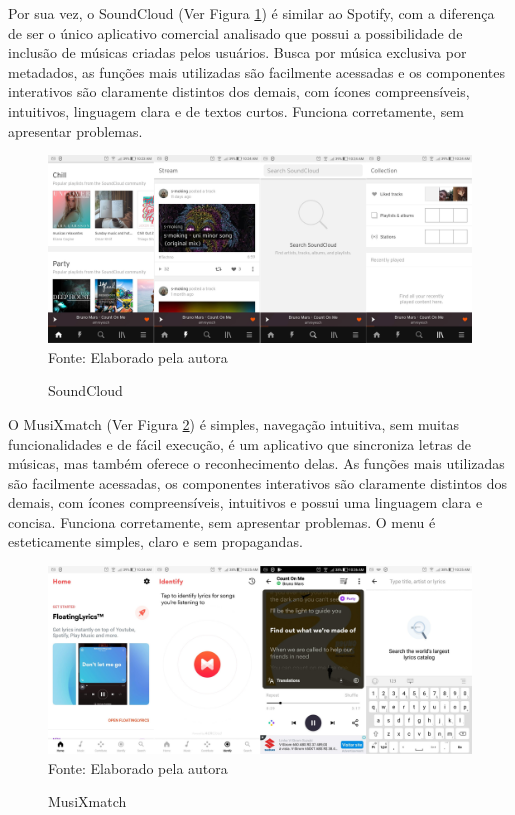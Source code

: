 Por sua vez, o SoundCloud (Ver Figura \ref{fig:soundcloud}) é similar ao Spotify, com a diferença de ser o único aplicativo comercial analisado que possui a possibilidade de inclusão de músicas criadas pelos usuários. Busca por música exclusiva por metadados, as funções mais utilizadas são facilmente acessadas e os componentes interativos são claramente distintos dos demais, com ícones compreensíveis, intuitivos, linguagem clara e de textos curtos. Funciona corretamente, sem apresentar problemas.

\begin{figure}[!htb]
   \centering
   \caption{SoundCloud}\label{fig:soundcloud} 
   \includegraphics[scale=0.12]{figuras/soundcloud.jpg}
   \\Fonte: Elaborado pela autora
\end{figure}

O MusiXmatch (Ver Figura \ref{fig:musixmatch}) é simples, navegação intuitiva, sem muitas funcionalidades e de fácil execução, é um aplicativo que sincroniza letras de músicas, mas também oferece o reconhecimento delas. As funções mais utilizadas são facilmente acessadas, os componentes interativos são claramente distintos dos demais, com ícones compreensíveis, intuitivos e possui uma linguagem clara e concisa. Funciona corretamente, sem apresentar problemas. O menu é esteticamente simples, claro e sem propagandas.

\begin{figure}[!htb]
   \centering
   \caption{MusiXmatch}\label{fig:musixmatch} 
   \includegraphics[scale=0.12]{figuras/musixmatch.jpg}
   \\Fonte: Elaborado pela autora
\end{figure}

